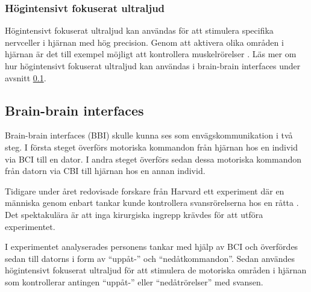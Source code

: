 \documentclass[12pt, a4paper]{article}
\begin{document}
\subsubsection{Högintensivt fokuserat ultraljud}

Högintensivt fokuserat ultraljud kan användas för att stimulera specifika nervceller i hjärnan med hög precision. Genom att aktivera olika områden i hjärnan är det till exempel möjligt att kontrollera muskelrörelser \cite{bbi}. Läs mer om hur högintensivt fokuserat ultraljud kan användas i brain-brain interfaces under avsnitt \ref{BBI}.






\subsection{Brain-brain interfaces}
\label{BBI}

Brain-brain interfaces (BBI) skulle kunna ses som envägskommunikation i två steg. I första steget överförs motoriska kommandon från hjärnan hos en individ via BCI till en dator. I andra steget överförs sedan dessa motoriska kommandon från datorn via CBI till hjärnan hos en annan individ.

Tidigare under året redovisade forskare från Harvard ett experiment där en människa genom enbart tankar kunde kontrollera svansrörelserna hos en råtta \cite{bbi}. Det spektakulära är att inga kirurgiska ingrepp krävdes för att utföra experimentet.

I experimentet analyserades personens tankar med hjälp av BCI och överfördes sedan till datorns i form av ``uppåt-'' och ``nedåtkommandon''. Sedan användes högintensivt fokuserat ultraljud för att stimulera de motoriska områden i hjärnan som kontrollerar antingen ``uppåt-'' eller ``nedåtrörelser'' med svansen.
\end{document}
